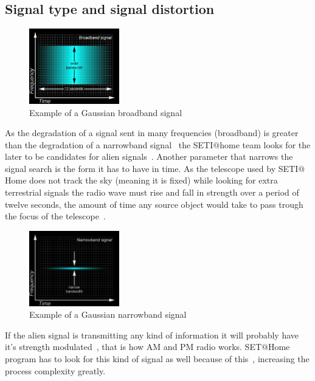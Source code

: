 \subsection{Signal type and signal 
distortion}\label{hid-sp18-601-subsection-signal}
\begin{figure}[!htb]
        \centering
        \includegraphics[width=0.35\textwidth]{figures/broadband.pdf}
        \caption{Example of a Gaussian broadband
        signal~\cite{hid-sp18-601-www-sathome-howworks}}\label{broadbandfigure}
\end{figure}
As the degradation of a signal sent in many frequencies (broadband) is greater 
than the degradation of a narrowband 
signal~\cite{hid-sp18-601-www-sathome-interference} the SETI$@$home team looks
 for the later to be candidates for alien 
 signals~\cite{hid-sp18-601-www-sathome-howworks}. Another parameter that 
 narrows the signal search is the form it has to have in time. As the telescope 
 used by SETI$@$Home does not track the sky (meaning it is fixed) while looking 
 for extra terrestrial signals the radio wave must rise and fall in strength 
 over a period of twelve seconds, the amount of time any source object would 
 take  to pass trough the focus of the 
 telescope~\cite{hid-sp18-601-www-sathome-interference}.

\begin{figure}[!htb]
        \centering
        \includegraphics[width=0.35\textwidth]{figures/narrow.pdf}
        \caption{Example of a Gaussian narrowband
        signal~\cite{hid-sp18-601-www-sathome-howworks}}\label{broadbandfigure}
\end{figure}
 
 If the alien signal is transmitting any kind of information it will probably 
 have it's strength modulated~\cite{hid-sp18-601-book-gray1961radio}, that is
 how AM and PM radio works. SET$@$Home program has to look for this kind of 
 signal as well because of 
 this~\cite{hid-sp18-601-www-sathome-howworks}, increasing the process 
 complexity greatly.

